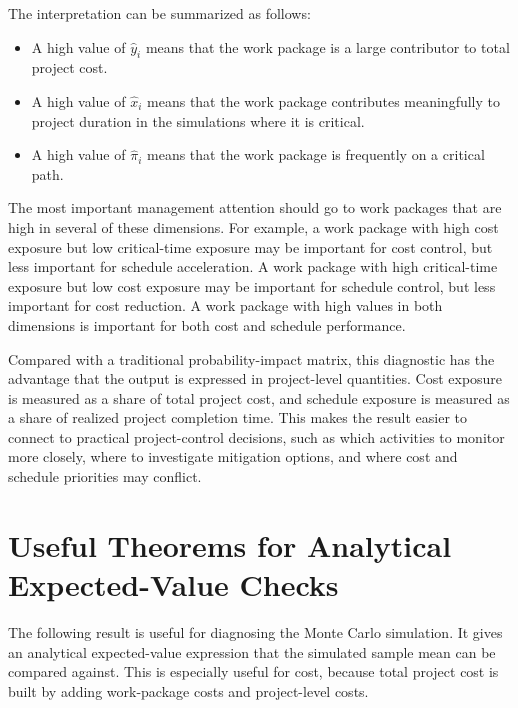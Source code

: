 \documentclass[11pt,a4paper]{article}
\newcommand{\1}{\mathbf{1}}
\theoremstyle{definition}
\theoremstyle{plain}
\theoremstyle{remark}
\numberwithin{equation}{section}
\begin{document}
The interpretation can be summarized as follows:

\begin{itemize}
    \item A high value of $\widehat y_i$ means that the work package is a large contributor to total project cost.
    \item A high value of $\widehat x_i$ means that the work package contributes meaningfully to project duration in the simulations where it is critical.
    \item A high value of $\widehat\pi_i$ means that the work package is frequently on a critical path.
\end{itemize}

The most important management attention should go to work packages that are high in several of these dimensions. For example, a work package with high cost exposure but low critical-time exposure may be important for cost control, but less important for schedule acceleration. A work package with high critical-time exposure but low cost exposure may be important for schedule control, but less important for cost reduction. A work package with high values in both dimensions is important for both cost and schedule performance.

Compared with a traditional probability-impact matrix, this diagnostic has the advantage that the output is expressed in project-level quantities. Cost exposure is measured as a share of total project cost, and schedule exposure is measured as a share of realized project completion time. This makes the result easier to connect to practical project-control decisions, such as which activities to monitor more closely, where to investigate mitigation options, and where cost and schedule priorities may conflict.
 
\newpage
\printbibliography

\newpage
\appendix


\section{Useful Theorems for Analytical Expected-Value Checks}

The following result is useful for diagnosing the Monte Carlo simulation. It gives an analytical expected-value expression that the simulated sample mean can be compared against. This is especially useful for cost, because total project cost is built by adding work-package costs and project-level costs.
\end{document}
